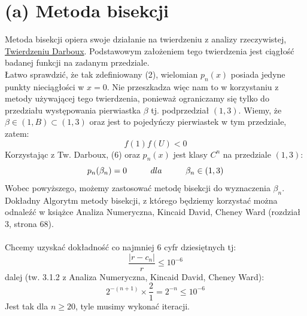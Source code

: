 \documentclass{article}
\newcommand\tab[1][1cm]{\hspace*{#1}}
\begin{document}
\section{(a) Metoda bisekcji}
Metoda bisekcji opiera swoje działanie na twierdzeniu z analizy rzeczywistej, \href{https://pl.wikipedia.org/wiki/Twierdzenie_Darboux}{Twierdzeniu Darboux}. Podstawowym założeniem tego twierdzenia jest ciągłość badanej funkcji na zadanym przedziale.\\
Łatwo sprawdzić, że tak zdefiniowany (2), wielomian $p_n(x)$ posiada jedyne punkty nieciągłości w $x = 0$. Nie przeszkadza więc nam to w korzystaniu z metody używającej tego twierdzenia, ponieważ ograniczamy się tylko do przedziału występowania pierwiastka $\beta$ tj. podprzedział $(1,3)$.
\newline
Wiemy, że $\beta \in (1,B) \subset (1,3)$ oraz jest to pojedyńczy pierwiastek w tym przedziale, zatem:
\begin{equation}
f(1)f(U) < 0
\end{equation}
Korzystając z Tw. Darboux, (6) oraz $p_n(x)$ jest klasy $C^n$ na przedziale $(1,3)$:
$$
p_n(\beta_n) = 0 \tab dla \tab \beta_n \in (1,3)
$$
Wobec powyższego, możemy zastosować metodę bisekcji do wyznaczenia $\beta_n$.
Dokładny Algorytm metody bisekcji, z którego będziemy korzystać można odnaleźć w książce Analiza Numeryczna, Kincaid David, Cheney Ward (rozdział 3, strona 68).\\\\
Chcemy uzyskać dokładność co najmniej 6 cyfr dziesiętnych tj:
$$
\frac{|r-c_n|}{r} \leq 10^{-6}
$$
dalej (tw. 3.1.2 z Analiza Numeryczna, Kincaid David, Cheney Ward):
$$
2^{-(n+1)} \times \frac{2}{1} = 2^{-n} \leq 10^{-6}
$$
Jest tak dla $n \geq 20$, tyle musimy wykonać iteracji.
\end{document}
